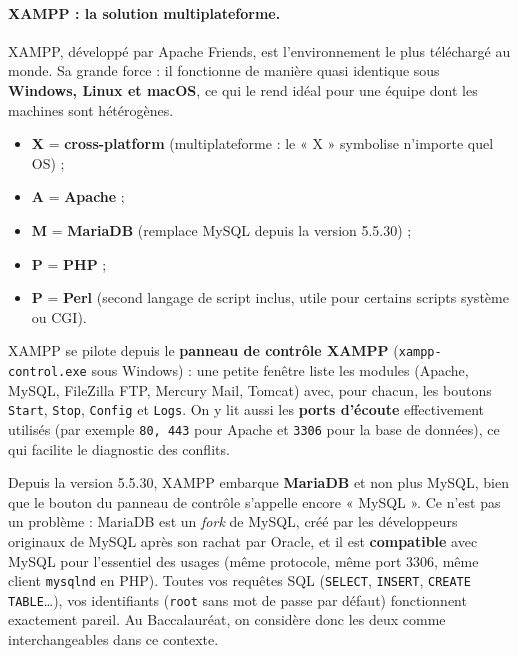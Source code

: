 \documentclass[11pt]{article}
\newcommand{\cle}[1]{{\popxbold\color{popdark}#1}}
\begin{document}
\paragraph{XAMPP : la solution multiplateforme.}
\cle{XAMPP}, développé par Apache Friends, est l'environnement le plus téléchargé au monde. Sa grande force : il fonctionne de manière quasi identique sous \textbf{Windows, Linux et macOS}, ce qui le rend idéal pour une équipe dont les machines sont hétérogènes.

\begin{exemplebox}
\begin{itemize}
\item \textbf{X} = \textbf{cross-platform} (multiplateforme : le « X » symbolise n'importe quel OS) ;
\item \textbf{A} = \textbf{Apache} ;
\item \textbf{M} = \textbf{MariaDB} (remplace MySQL depuis la version 5.5.30) ;
\item \textbf{P} = \textbf{PHP} ;
\item \textbf{P} = \textbf{Perl} (second langage de script inclus, utile pour certains scripts système ou CGI).
\end{itemize}
\end{exemplebox}

XAMPP se pilote depuis le \textbf{panneau de contrôle XAMPP} (\texttt{xampp-control.exe} sous Windows) : une petite fenêtre liste les modules (Apache, MySQL, FileZilla FTP, Mercury Mail, Tomcat) avec, pour chacun, les boutons \texttt{Start}, \texttt{Stop}, \texttt{Config} et \texttt{Logs}. On y lit aussi les \textbf{ports d'écoute} effectivement utilisés (par exemple \texttt{80, 443} pour Apache et \texttt{3306} pour la base de données), ce qui facilite le diagnostic des conflits.

\begin{attention}
Depuis la version 5.5.30, XAMPP embarque \textbf{MariaDB} et non plus MySQL, bien que le bouton du panneau de contrôle s'appelle encore « MySQL ». Ce n'est pas un problème : MariaDB est un \emph{fork} de MySQL, créé par les développeurs originaux de MySQL après son rachat par Oracle, et il est \textbf{compatible} avec MySQL pour l'essentiel des usages (même protocole, même port 3306, même client \texttt{mysqlnd} en PHP). Toutes vos requêtes SQL (\texttt{SELECT}, \texttt{INSERT}, \texttt{CREATE TABLE}\ldots), vos identifiants (\texttt{root} sans mot de passe par défaut) fonctionnent exactement pareil. Au Baccalauréat, on considère donc les deux comme interchangeables dans ce contexte.
\end{attention}
\end{document}

